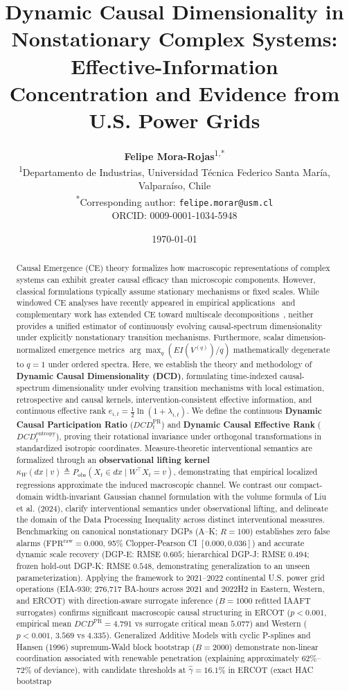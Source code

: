 \documentclass[10pt,twocolumn,journal]{article}
\title{\textbf{Dynamic Causal Dimensionality in Nonstationary Complex Systems:}\\
\large Effective-Information Concentration and Evidence from U.S. Power Grids}
\author{
  \textbf{Felipe Mora-Rojas}\textsuperscript{1,*} \\
  \small \textsuperscript{1}Departamento de Industrias, Universidad Técnica Federico Santa María, Valparaíso, Chile \\
  \small \textsuperscript{*}Corresponding author: \texttt{felipe.morar@usm.cl} \\
  \small ORCID: 0009-0001-1034-5948
}
\date{\today}
\begin{document}
\maketitle

\begin{abstract}
Causal Emergence (CE) theory formalizes how macroscopic representations of complex systems can exhibit greater causal efficacy than microscopic components. However, classical formulations typically assume stationary mechanisms or fixed scales. While windowed CE analyses have recently appeared in empirical applications~\cite{cheng2025information} and complementary work has extended CE toward multiscale decompositions~\cite{hoel2026causal}, neither provides a unified estimator of continuously evolving causal-spectrum dimensionality under explicitly nonstationary transition mechanisms. Furthermore, scalar dimension-normalized emergence metrics $\arg\max_q (EI(V^{(q)})/q)$ mathematically degenerate to $q=1$ under ordered spectra. Here, we establish the theory and methodology of \textbf{Dynamic Causal Dimensionality (DCD)}, formulating time-indexed causal-spectrum dimensionality under evolving transition mechanisms with local estimation, retrospective and causal kernels, intervention-consistent effective information, and continuous effective rank $e_{i,t} = \frac{1}{2}\ln(1 + \lambda_{i,t})$. We define the continuous \textbf{Dynamic Causal Participation Ratio} ($DCD_t^{\text{PR}}$) and \textbf{Dynamic Causal Effective Rank} ($DCD_t^{\text{entropy}}$), proving their rotational invariance under orthogonal transformations in standardized isotropic coordinates. Measure-theoretic interventional semantics are formalized through an \textbf{observational lifting kernel} $\kappa_W(dx \mid v) \triangleq P_{\text{obs}}(X_t \in dx \mid W^\top X_t = v)$, demonstrating that empirical localized regressions approximate the induced macroscopic channel. We contrast our compact-domain width-invariant Gaussian channel formulation with the volume formula of Liu et al. (2024), clarify interventional semantics under observational lifting, and delineate the domain of the Data Processing Inequality across distinct interventional measures. Benchmarking on canonical nonstationary DGPs (A--K; $R=100$) establishes zero false alarms ($\text{FPR}^{\text{raw}} = 0.000$, 95\% Clopper-Pearson CI $[0.000, 0.036]$) and accurate dynamic scale recovery (DGP-E: RMSE $0.605$; hierarchical DGP-J: RMSE $0.494$; frozen hold-out DGP-K: RMSE $0.548$, demonstrating generalization to an unseen parameterization). Applying the framework to 2021--2022 continental U.S. power grid operations (EIA-930; 276,717 BA-hours across 2021 and 2022H2 in Eastern, Western, and ERCOT) with direction-aware surrogate inference ($B=1000$ refitted IAAFT surrogates) confirms significant macroscopic causal structuring in ERCOT ($p < 0.001$, empirical mean $DCD^{\text{PR}} = 4.791$ vs surrogate critical mean $5.077$) and Western ($p < 0.001$, $3.569$ vs $4.335$). Generalized Additive Models with cyclic P-splines and Hansen (1996) supremum-Wald block bootstrap ($B=2000$) demonstrate non-linear coordination associated with renewable penetration (explaining approximately $62\%$--$72\%$ of deviance), with candidate thresholds at $\hat{\gamma} = 16.1\%$ in ERCOT (exact HAC bootstrap 
\end{abstract}
\end{document}
